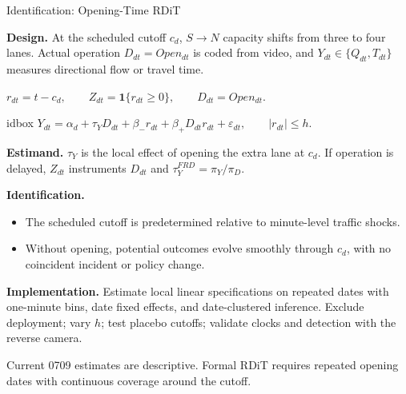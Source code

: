 \documentclass[11pt,aspectratio=169]{beamer}
\newcommand{\muted}[1]{\textcolor{gray!75!black}{#1}}
\begin{document}
\begin{frame}{Identification: Opening-Time RDiT}
\small

\textbf{Design.}
At the scheduled cutoff $c_d$, $S\to N$ capacity shifts from three to four lanes. Actual operation $D_{dt}=Open_{dt}$ is coded from video, and $Y_{dt}\in\{Q_{dt},T_{dt}\}$ measures directional flow or travel time.

\vspace{0.4em}
{\centering
$\displaystyle r_{dt}=t-c_d,\qquad
 Z_{dt}=\mathbf{1}\{r_{dt}\geq0\},\qquad
 D_{dt}=Open_{dt}. $\par}

\vspace{0.5em}
\begin{beamercolorbox}[wd=0.94\linewidth,sep=0.55em,center]{idbox}
{\large
$\displaystyle
Y_{dt}=\alpha_d+\tau_Y D_{dt}
+\beta_-r_{dt}+\beta_+D_{dt}r_{dt}+\varepsilon_{dt},
\qquad |r_{dt}|\leq h.$}
\end{beamercolorbox}

\vspace{0.4em}
\textbf{Estimand.}
$\tau_Y$ is the local effect of opening the extra lane at $c_d$. If operation is delayed, $Z_{dt}$ instruments $D_{dt}$ and $\tau_Y^{FRD}=\pi_Y/\pi_D$.

\vspace{0.35em}
\textbf{Identification.}
\begin{itemize}\small\setlength\itemsep{0.08em}
  \item The scheduled cutoff is predetermined relative to minute-level traffic shocks.
  \item Without opening, potential outcomes evolve smoothly through $c_d$, with no coincident incident or policy change.
\end{itemize}

\vspace{0.05em}
\textbf{Implementation.}
Estimate local linear specifications on repeated dates with one-minute bins, date fixed effects, and date-clustered inference. Exclude deployment; vary $h$; test placebo cutoffs; validate clocks and detection with the reverse camera.

\vfill
{\tiny \muted{Current 0709 estimates are descriptive. Formal RDiT requires repeated opening dates with continuous coverage around the cutoff.}}
\end{frame}
\end{document}
